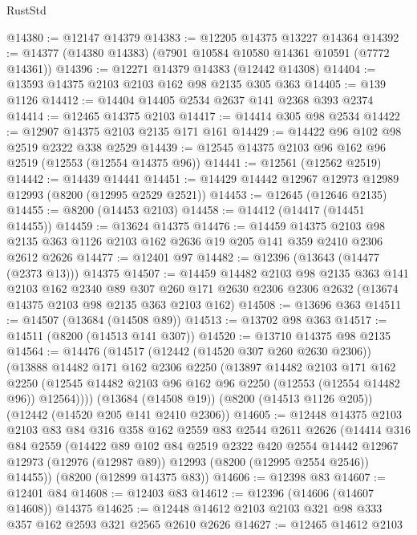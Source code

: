 \begin{lexlean}{RustStd}
\begin{coremodule}
@14380 := @12147 @14379
@14383 := @12205 @14375 @13227 @14364
@14392 := @14377 (@14380 @14383) (@7901 @10584 @10580 @14361 @10591 (@7772 @14361))
@14396 := @12271 @14379 @14383 (@12442 @14308)
@14404 := @13593 @14375 @2103 @2103 @162 @98 @2135 @305 @363
@14405 := @139 @1126
@14412 := @14404 @14405 @2534 @2637 @141 @2368 @393 @2374
@14414 := @12465 @14375 @2103
@14417 := @14414 @305 @98 @2534
@14422 := @12907 @14375 @2103 @2135 @171 @161
@14429 := @14422 @96 @102 @98 @2519 @2322 @338 @2529
@14439 := @12545 @14375 @2103 @96 @162 @96 @2519 (@12553 (@12554 @14375 @96))
@14441 := @12561 (@12562 @2519)
@14442 := @14439 @14441
@14451 := @14429 @14442 @12967 @12973 @12989 @12993 (@8200 (@12995 @2529 @2521))
@14453 := @12645 (@12646 @2135)
@14455 := @8200 (@14453 @2103)
@14458 := @14412 (@14417 (@14451 @14455))
@14459 := @13624 @14375
@14476 := @14459
    @14375
    @2103
    @98
    @2135
    @363
    @1126
    @2103
    @162
    @2636
    @19
    @205
    @141
    @359
    @2410
    @2306
    @2612
    @2626
@14477 := @12401 @97
@14482 := @12396 (@13643 (@14477 (@2373 @13))) @14375
@14507 := @14459
    @14482
    @2103
    @98
    @2135
    @363
    @141
    @2103
    @162
    @2340
    @89
    @307
    @260
    @171
    @2630
    @2306
    @2306
    @2632
    (@13674 @14375 @2103 @98 @2135 @363 @2103 @162)
@14508 := @13696 @363
@14511 := @14507 (@13684 (@14508 @89))
@14513 := @13702 @98 @363
@14517 := @14511 (@8200 (@14513 @141 @307))
@14520 := @13710 @14375 @98 @2135
@14564 := @14476
    (@14517
      (@12442 (@14520 @307 @260 @2630 @2306))
      (@13888
        @14482
        @171
        @162
        @2306
        @2250
        (@13897
          @14482
          @2103
          @171
          @162
          @2250
          (@12545 @14482 @2103 @96 @162 @96 @2250 (@12553 (@12554 @14482 @96)) @12564))))
    (@13684 (@14508 @19))
    (@8200 (@14513 @1126 @205))
    (@12442 (@14520 @205 @141 @2410 @2306))
@14605 := @12448
    @14375
    @2103
    @2103
    @83
    @84
    @316
    @358
    @162
    @2559
    @83
    @2544
    @2611
    @2626
    (@14414
      @316
      @84
      @2559
      (@14422
        @89
        @102
        @84
        @2519
        @2322
        @420
        @2554
        @14442
        @12967
        @12973
        (@12976 (@12987 @89))
        @12993
        (@8200 (@12995 @2554 @2546))
        @14455))
    (@8200 (@12899 @14375 @83))
@14606 := @12398 @83
@14607 := @12401 @84
@14608 := @12403 @83
@14612 := @12396 (@14606 (@14607 @14608)) @14375
@14625 := @12448 @14612 @2103 @2103 @321 @98 @333 @357 @162 @2593 @321 @2565 @2610 @2626
@14627 := @12465 @14612 @2103

\end{coremodule}
\end{lexlean}
